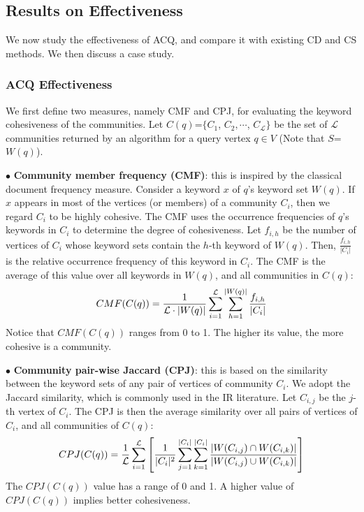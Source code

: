 \subsection{Results on Effectiveness}
\label{effectiveness}

We now study the effectiveness of ACQ, and compare it with existing CD and CS methods. We then discuss a case study.

\subsubsection{ACQ Effectiveness}
\label{metric}

We first define two measures, namely CMF and CPJ, for evaluating the keyword cohesiveness of the communities.
Let $C(q)$=$\{C_1$, $C_2, \cdots$, $C_{\mathcal{L}}\}$ be the set of $\mathcal L$ communities returned by an algorithm for a query vertex $q \in V$ (Note that $S$=$W(q)$).

$\bullet$ {\bf Community member frequency (CMF)}:  this is inspired by the classical document frequency
measure. Consider a keyword $x$ of $q$'s keyword set $W(q)$. If $x$ appears in most of the vertices (or members) of  a community $C_i$, then we regard $C_i$ to be highly cohesive. The CMF uses the occurrence frequencies of $q$'s keywords in $C_i$ to determine the degree of cohesiveness. Let $f_{i,h}$ be the number of vertices of $C_i$ whose keyword sets contain the $h$-th keyword of $W(q)$. Then, $\frac{f_{i,h}}{|C_i|}$ is the relative occurrence frequency of this keyword in $C_i$. The CMF is the average of this value over all keywords in
$W(q)$, and all communities in $C(q)$:
\begin{equation}
\begin{small}
  \label{eq:amf}
    CMF(C(q)) = \frac{1}{{{\cal L} \cdot \left| {W(q)} \right|}}\sum\limits_{i = 1}^{\cal L} {\sum\limits_{h=1}^{\left| {W(q)} \right|} {\frac{{{f_{i,h}}}}{{|{C_i}|}}} }
 \end{small}
\end{equation}
Notice that $CMF(C(q))$ ranges from 0 to 1. The higher its value, the more cohesive is a community.

$\bullet$ {\bf Community pair-wise Jaccard (CPJ)}: this is based on the similarity between the keyword sets of any pair of vertices of community $C_i$. We adopt the Jaccard similarity, which is commonly used in the IR literature. Let $C_{i,j}$ be the $j$-th vertex of $C_i$.  The CPJ is then the average similarity over all pairs of vertices of $C_i$, and all communities of $C(q)$:
\begin{equation}
  \small
  \label{eq:apj}
    CPJ(C(q))=\frac{1}{{\cal L}}\sum\limits_{i = 1}^{\cal L} {\left[ {\frac{1}{{|{C_i}{|^2}}}\sum\limits_{j = 1}^{|{C_i}|} {\sum\limits_{k = 1}^{|{C_i}|} {\frac{{\left| {W({C_{i,j}}) \cap W({C_{i,k}})} \right|}}{{\left| {W({C_{i,j}}) \cup W({C_{i,k}})} \right|}}} } } \right]}
\end{equation}
The $CPJ(C(q))$ value has a range of 0 and 1. A higher value of $CPJ(C(q))$ implies better cohesiveness.

